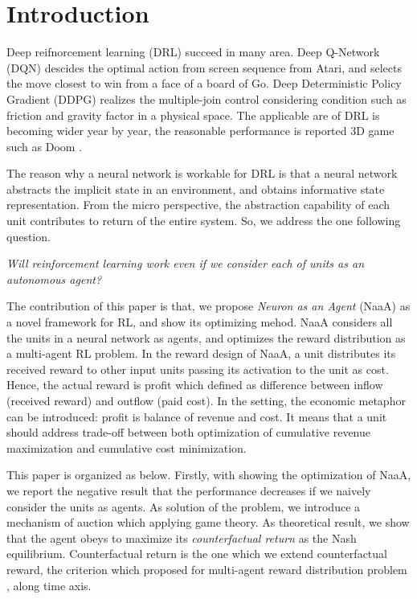 \section{Introduction}
Deep reifnorcement learning (DRL) succeed in many area.
Deep Q-Network (DQN) \citep{mnih2015human,silver2016mastering} descides the optimal action from screen sequence from Atari, and selects the move closest to win from a face of a board of Go.
Deep Deterministic Policy Gradient (DDPG) \citep{lillicrap2015continuous} realizes the multiple-join control considering condition such as friction and gravity factor in a physical space.
The applicable are of DRL is becoming wider year by year, the reasonable performance is reported 3D game such as Doom \citep{dosovitskiy2016learning}.

The reason why a neural network is workable for DRL is that a neural network abstracts the implicit state in an environment, and obtains informative state representation.
From the micro perspective, the abstraction capability of each unit contributes to return of the entire system.
So, we address the one following question.

\begin{center}
{\em Will reinforcement learning work even if we consider each of units as an autonomous agent?}
\end{center}

The contribution of this paper is that, we propose {\em Neuron as an Agent} (NaaA) as a novel framework for RL, and show its optimizing mehod.
NaaA considers all the units in a neural network as agents, and optimizes the reward distribution as a multi-agent RL problem.
In the reward design of NaaA, a unit distributes its received reward to other input units passing its activation to the unit as cost.
Hence, the actual reward is profit which defined as difference between inflow (received reward) and outflow (paid cost).
In the setting, the economic metaphor can be introduced: profit is balance of revenue and cost. 
It means that a unit should address trade-off between both optimization of cumulative revenue maximization and cumulative cost minimization.

This paper is organized as below.
Firstly, with showing the optimization of NaaA, we report the negative result that the performance decreases if we naively consider the units as agents.
As solution of the problem, we introduce a mechanism of auction which applying game theory.
As theoretical result, we show that the agent obeys to maximize its {\em counterfactual return} as the Nash equilibrium.
Counterfactual return is the one which we extend counterfactual reward, the criterion which proposed for multi-agent reward distribution problem \citep{agogino2006quicr}, along time axis.

